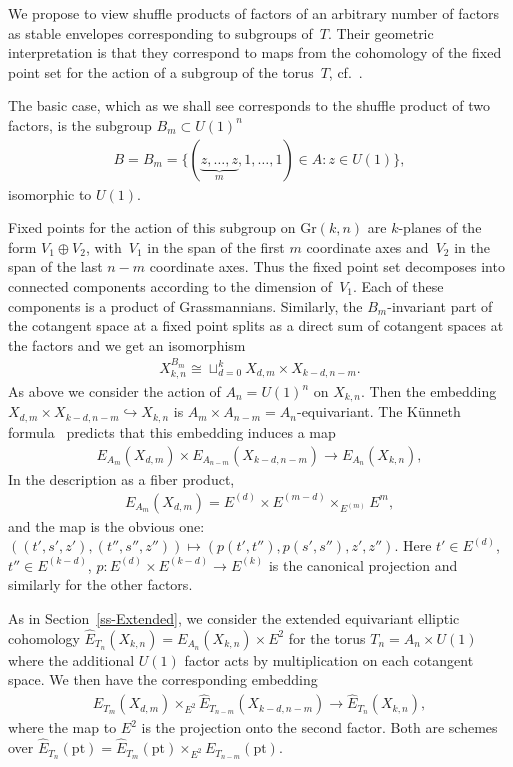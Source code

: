 \documentclass[pdftex]{sigma}
\numberwithin{equation}{section}
\begin{document}
We propose to view shuffle products of factors of an arbitrary number of factors as stable envelopes corresponding to subgroups of~$T$. Their geometric interpretation is that they correspond to maps from the cohomology of the fixed point set for the action of a subgroup of the torus~$T$, cf.~\cite[Section 3.6]{MO}.

The basic case, which as we shall see corresponds to the shuffle product of two factors, is the subgroup $B_m\subset U(1)^n$
\begin{gather*}
 B=B_m=\{(\underbrace {z,\dots,z}_m,1,\dots,1)\in A \colon z\in U(1)\},
\end{gather*}
isomorphic to $U(1)$.

Fixed points for the action of this subgroup on $\mathrm{Gr}(k,n)$ are $k$-planes of the form $V_1\oplus V_2$, with~$V_1$ in the span of the first $m$ coordinate axes and~$V_2$ in the span of the last $n-m$ coordinate axes. Thus the fixed point set decomposes into connected components according to the dimension of~$V_1$. Each of these components is a product of Grassmannians. Similarly, the $B_m$-invariant part of the cotangent space at a fixed point splits as a direct sum of cotangent spaces at the factors and we get an isomorphism
\begin{gather*}
 X_{k,n}^{B_m}\cong \sqcup_{d=0}^k X_{d,m}\times X_{k-d,n-m}.
\end{gather*}
As above we consider the action of $A_n=U(1)^n$ on $X_{k,n}$. Then the embedding $X_{d,m}\times X_{k-d,n-m}\hookrightarrow X_{k,n}$ is $A_m\times A_{n-m}= A_n$-equivariant. The K\"unneth formula~\cite{GKV} predicts that this embedding induces a map
\begin{gather}\label{e-Kunn}
 E_{A_m}(X_{d,m})\times E_{A_{n-m}}(X_{k-d,n-m})\to E_{A_n}(X_{k,n}),
\end{gather}
In the description as a fiber product,
\begin{gather*}
 E_{A_m}(X_{d,m})=E^{(d)}\times E^{(m-d)}\times_{E^{(m)}}E^m,
\end{gather*}
and the map is the obvious one: $((t',s',z'),(t'',s'',z''))\mapsto (p(t',t''),p(s',s''),z',z'')$. Here $t'\in E^{(d)}$, $t''\in E^{(k-d)}$, $p\colon E^{(d)}\times E^{(k-d)}\to E^{(k)}$ is the canonical projection and similarly for the other factors.

As in Section~\ref{ss-Extended}, we consider the extended equivariant elliptic cohomology $\hat E_{T_n}(X_{k,n})=E_{A_n}(X_{k,n})\times E^2$ for the torus $T_n=A_n\times U(1)$ where the additional $U(1)$ factor acts by multiplication on each cotangent space. We then have the corresponding embedding
\begin{gather}\label{e-embedding}
 \hat E_{T_m}(X_{d,m})\times_{E^2}\hat E_{T_{n-m}}(X_{k-d,n-m})\to \hat E_{T_n}(X_{k,n}),
\end{gather}
where the map to $E^2$ is the projection onto the second factor. Both are schemes over $\hat E_{T_n}(\mathrm{pt})=\hat E_{T_m}(\mathrm{pt})\times_{E^2}E_{T_{n-m}}(\mathrm{pt})$.
\end{document}
